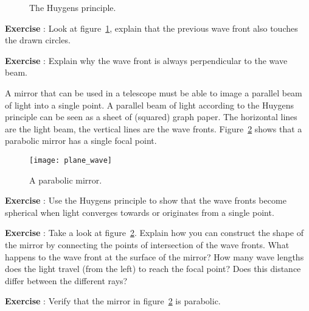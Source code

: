\begin{figure}
\begin{center}
\caption{The Huygens principle.} \label{fig:huygens}
\end{center}
\end{figure}

\begin{shaded}
\textbf{Exercise \theExercise {}} : Look at figure~\ref{fig:huygens}, explain that the previous wave front also touches the drawn circles.\end{shaded}
\begin{shaded}
\textbf{Exercise \theExercise {}} : Explain why the wave front is always perpendicular to the wave beam.\end{shaded}

A mirror that can be used in a telescope must be able to image a parallel beam of light into a single point. A parallel beam of light according to the Huygens principle can be seen as a sheet of (squared) graph paper. The horizontal lines are the light beam, the vertical lines are the wave fronts. Figure~\ref{fig:plane_wave} shows that a parabolic mirror has a single focal point.

\begin{figure}\begin{center}
\texttt{[image: plane\_wave]}
\caption{A parabolic mirror.}\label{fig:plane_wave}
\end{center}\end{figure}

\begin{shaded}
\textbf{Exercise \theExercise {}} : Use the Huygens principle to show that the wave fronts become spherical when light converges towards or originates from a single point.\end{shaded}
\begin{shaded}
\textbf{Exercise \theExercise {}} : Take a look at figure~\ref{fig:plane_wave}. Explain how you can construct the shape of the mirror by connecting the points of intersection of the wave fronts. What happens to the wave front at the surface of the mirror? How many wave lengths does the light travel (from the left) to reach the focal point? Does this distance differ between the different rays?\end{shaded}
\begin{shaded}
\textbf{Exercise \theExercise {}} : Verify that the mirror in figure~\ref{fig:plane_wave} is parabolic.\end{shaded}

